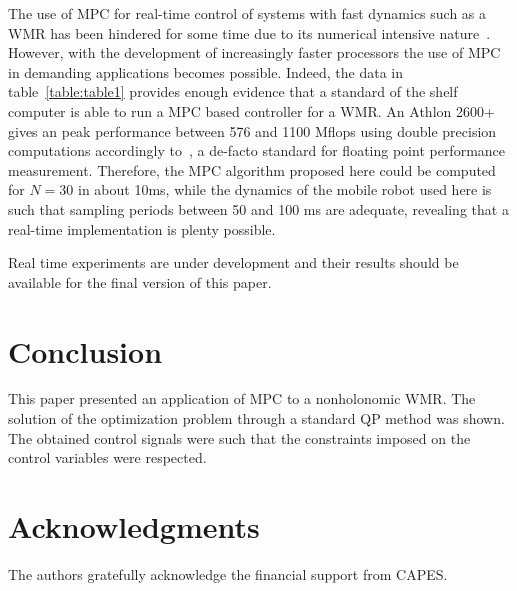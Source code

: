 \documentclass[conference]{IEEEtran} %
\begin{document}
The use of MPC for real-time control of systems with fast dynamics such as a
WMR has been hindered for some time due to its numerical intensive
nature~\cite{cannon00}. However, with the development of increasingly faster
processors the use of MPC in demanding applications becomes possible.
Indeed, the data in table~\ref{table:table1} provides enough evidence that a
standard of the shelf computer is able to run a MPC based controller for a
WMR. An Athlon 2600+ gives an peak performance between 576 and 1100 Mflops
using double precision computations accordingly
to~\cite{aburto:flops-1992-dec}, a de-facto standard for floating point
performance measurement. Therefore, the MPC algorithm proposed here could be
computed for $N=30$ in about 10ms, while the dynamics of the mobile robot
used here is such that sampling periods between 50 and 100 ms are adequate,
revealing that a real-time implementation is plenty possible.

Real time experiments are under
development and their results should be available for the final version of
this paper.

\section{Conclusion}
\label{sec:conclusions}

This paper presented an application of MPC to a nonholonomic WMR. The
solution of the optimization problem through a standard QP method was shown.
The obtained control signals were such that the constraints imposed on the
control variables were respected. 

\section*{Acknowledgments}

The authors gratefully acknowledge the financial support from CAPES.



\end{document}
